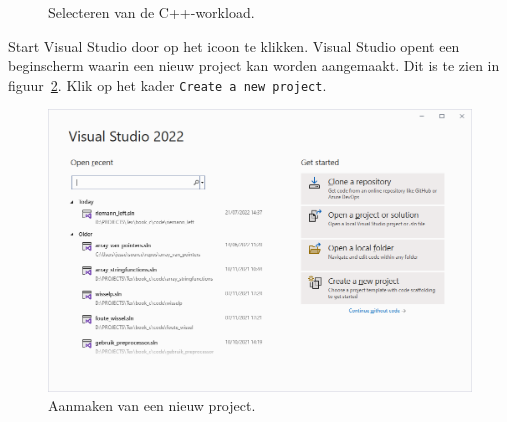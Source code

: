 \begin{figure}[H]
\centering
{}
\caption{Selecteren van de C++-workload.}
\label{fig:100installworkload}
\end{figure}

Start Visual Studio door op het icoon te klikken. Visual Studio opent een beginscherm waarin een nieuw project kan worden aangemaakt. Dit is te zien in figuur~\ref{fig:101newproject}. Klik op het kader \texttt{Create a new project}.

\begin{figure}[H]
\centering
\includegraphics[scale=\figscaleH]{images/101newproject}
\caption{Aanmaken van een nieuw project.}
\label{fig:101newproject}
\end{figure}

